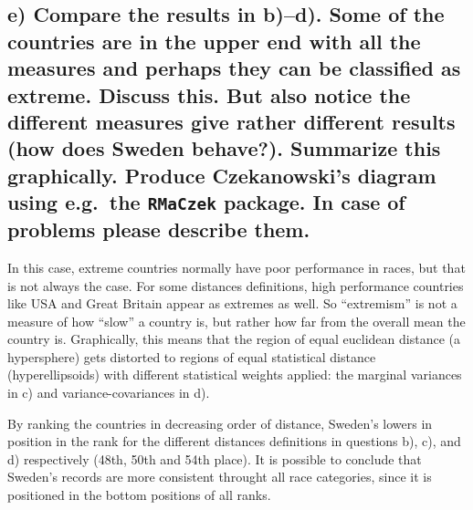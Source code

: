 \documentclass[]{article}
\begin{document}
\hypertarget{e-compare-the-results-in-bd.-some-of-the-countries-are-in-the-upper-end-with-all-the-measures-and-perhaps-they-can-be-classified-as-extreme.-discuss-this.-but-also-notice-the-different-measures-give-rather-different-results-how-does-sweden-behave.-summarize-this-graphically.-produce-czekanowskis-diagram-using-e.g.-the-rmaczek-package.-in-case-of-problems-please-describe-them.}{%
\subsection{\texorpdfstring{e) Compare the results in b)--d). Some of
the countries are in the upper end with all the measures and perhaps
they can be classified as extreme. Discuss this. But also notice the
different measures give rather different results (how does Sweden
behave?). Summarize this graphically. Produce Czekanowski's diagram
using e.g.~the \texttt{RMaCzek} package. In case of problems please
describe
them.}{e) Compare the results in b)--d). Some of the countries are in the upper end with all the measures and perhaps they can be classified as extreme. Discuss this. But also notice the different measures give rather different results (how does Sweden behave?). Summarize this graphically. Produce Czekanowski's diagram using e.g.~the RMaCzek package. In case of problems please describe them.}}\label{e-compare-the-results-in-bd.-some-of-the-countries-are-in-the-upper-end-with-all-the-measures-and-perhaps-they-can-be-classified-as-extreme.-discuss-this.-but-also-notice-the-different-measures-give-rather-different-results-how-does-sweden-behave.-summarize-this-graphically.-produce-czekanowskis-diagram-using-e.g.-the-rmaczek-package.-in-case-of-problems-please-describe-them.}}

In this case, extreme countries normally have poor performance in races,
but that is not always the case. For some distances definitions, high
performance countries like USA and Great Britain appear as extremes as
well. So ``extremism'' is not a measure of how ``slow'' a country is,
but rather how far from the overall mean the country is. Graphically,
this means that the region of equal euclidean distance (a hypersphere)
gets distorted to regions of equal statistical distance
(hyperellipsoids) with different statistical weights applied: the
marginal variances in c) and variance-covariances in d).

By ranking the countries in decreasing order of distance, Sweden's
lowers in position in the rank for the different distances definitions
in questions b), c), and d) respectively (48th, 50th and 54th place). It
is possible to conclude that Sweden's records are more consistent
throught all race categories, since it is positioned in the bottom
positions of all ranks.
\end{document}
